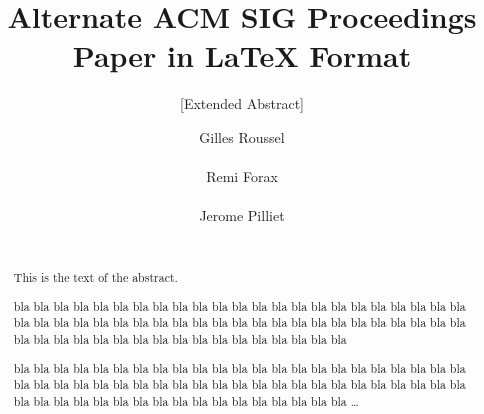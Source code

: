 \documentclass{sig-alternate}
\begin{document}

\title{Alternate {\ttlit ACM} SIG Proceedings Paper in LaTeX Format }
\subtitle{[Extended Abstract]
}

\author{
  \alignauthor Gilles Roussel\\
    \\
  \alignauthor Remi Forax\\
    \\
  \alignauthor Jerome Pilliet\\
    \\
}

\setlength{\pdfpageheight}{\paperheight}
\setlength{\pdfpagewidth}{\paperwidth}

\maketitle

\begin{abstract}
This is the text of the abstract.

bla bla bla bla bla bla bla bla bla
bla bla bla bla bla bla bla bla bla
bla bla bla bla bla bla bla bla bla
bla bla bla bla bla bla bla bla bla
bla bla bla bla bla bla bla bla bla
bla bla bla bla bla bla bla bla bla
bla bla bla bla bla bla bla bla bla

bla bla bla bla bla bla bla bla bla
bla bla bla bla bla bla bla bla bla
bla bla bla bla bla bla bla bla bla
bla bla bla bla bla bla bla bla bla
bla bla bla bla bla bla bla bla bla
bla bla bla bla bla bla bla bla bla
bla bla bla bla bla bla bla bla bla
\dots
\end{abstract}

\end{document}

